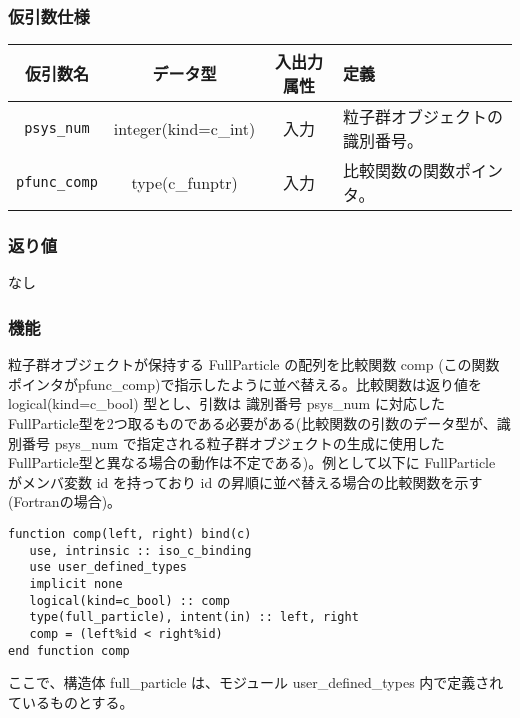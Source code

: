 \subsubsection*{仮引数仕様}
\begin{table}[h]
\begin{tabularx}{\linewidth}{cccX}
\toprule
\rowcolor{Snow2}
仮引数名 & データ型 & 入出力属性 & 定義 \\
\midrule
\texttt{psys\_num} & integer(kind=c\_int) & 入力 & 粒子群オブジェクトの識別番号。\\
\texttt{pfunc\_comp} & type(c\_funptr) & 入力 & 比較関数の関数ポインタ。\\
\bottomrule
\end{tabularx}
\end{table}

\subsubsection*{返り値}
なし

\subsubsection*{機能}
粒子群オブジェクトが保持する FullParticle の配列を比較関数 comp (この関数ポインタがpfunc\_comp)で指示したように並べ替える。比較関数は返り値を logical(kind=c\_bool) 型とし、引数は 識別番号 psys\_num に対応したFullParticle型を2つ取るものである必要がある(比較関数の引数のデータ型が、識別番号 psys\_num で指定される粒子群オブジェクトの生成に使用したFullParticle型と異なる場合の動作は不定である)。例として以下に FullParticle がメンバ変数 id を持っており id の昇順に並べ替える場合の比較関数を示す(Fortranの場合)。
\begin{lstlisting}[caption=比較関数の例]
function comp(left, right) bind(c)
   use, intrinsic :: iso_c_binding
   use user_defined_types
   implicit none
   logical(kind=c_bool) :: comp
   type(full_particle), intent(in) :: left, right
   comp = (left%id < right%id)
end function comp
\end{lstlisting}
ここで、構造体 full\_particle は、モジュール user\_defined\_types 内で定義されているものとする。


\clearpage
